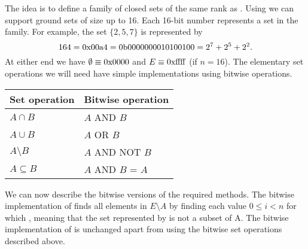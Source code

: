 The idea is to define a family of closed sets of the same rank as . Using  we can support ground sets of size up to 16. Each 16-bit number represents a set in the family. For example, the set $\{ 2,5,7 \}$ is represented by $$164 = 0\rm{x}00\rm{a}4 = 0\rm{b}0000000010100100 = 2^7+2^5+2^2.$$ At either end we have $\emptyset \equiv 0\rm{x}0000$ and $E \equiv 0\rm{xffff}$ (if $n = 16$). The elementary set operations we will need have simple implementations using bitwise operations.

\begin{table}[!ht]
  \centering
  \begin{tabular}{|l|l|}
  \hline
      Set operation & Bitwise operation \\\hline
      $A \cap B$      & $A$ AND $B$ \\\hline
      $A \cup B$      & $A$ OR $B$ \\\hline
      $A \setminus B$ & $A$ AND NOT $B$ \\\hline
      $A \subseteq B$ & $A$ AND $B$ = $A$ \\\hline
  \end{tabular}
\end{table}

We can now describe the bitwise versions of the required methods. The bitwise implementation of  finds all elements in $E \setminus A$ by finding each value $0\leq i< n$ for which , meaning that the set represented by  is not a subset of A. The bitwise implementation of  is unchanged apart from using the bitwise set operations described above.

